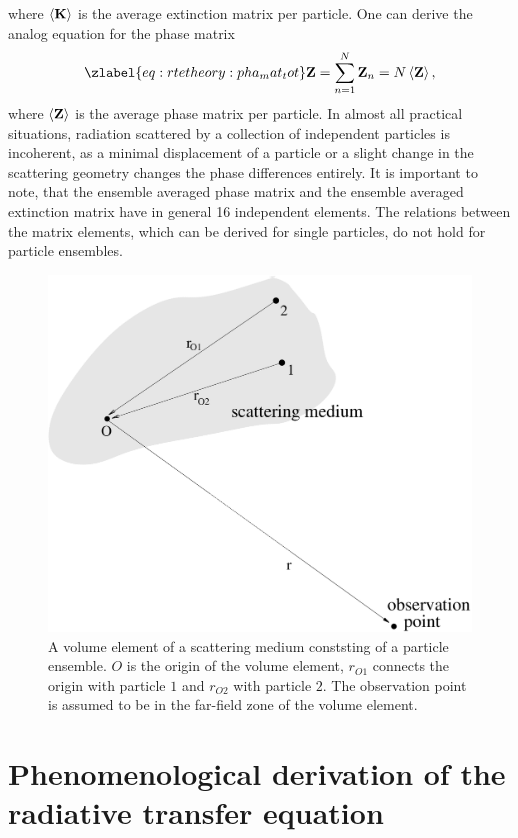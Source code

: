 where $\left\langle {\bf K} \right\rangle$ is the average extinction matrix per
particle. One can derive the analog equation for the phase matrix
 \begin{equation}
  \zlabel{eq:rtetheory:pha_mat_tot}
  \PhaMat = \sum_{n=1}^N  \MtrStl{Z}_n = N \EnsAvr{\PhaMat},
\end{equation}
where $\left\langle {\bf Z} \right\rangle$ is the average phase matrix per particle.  In
almost all practical situations, radiation scattered by a collection
of independent particles is incoherent, as a minimal displacement of a
particle or a slight change in the scattering geometry changes the
phase differences entirely.  It is important to note, that the
ensemble averaged phase matrix and the ensemble averaged extinction
matrix have in general 16 independent elements. The relations between
the matrix elements, which can be derived for single particles, do not
hold for particle ensembles.

\begin{figure}[t]
 \begin{center}
   \includegraphics*[width=0.6\hsize]{part_ensemble}
   \caption{A volume element of a scattering medium conststing of a particle ensemble. $O$ is the origin of the volume element, $r_{O1}$ connects the origin with particle $1$ and $r_{O2}$ with particle $2$. The observation point is assumed to be in the far-field zone of the volume element.}
 \end{center}
\end{figure}


\clearpage

\section[Radiative transfer equation]{Phenomenological derivation of the radiative transfer equation}

